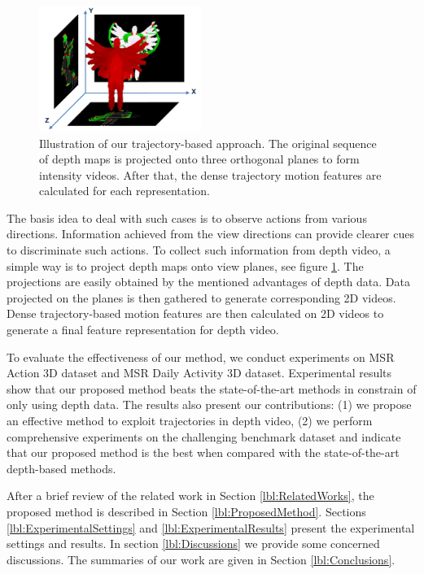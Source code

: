 \documentclass[final,3p,times,twocolumn]{elsarticle}
\begin{document}
\begin{figure}
	\begin{center}
		\includegraphics[width=0.47\textwidth]{Projections.pdf}
	\end{center}
	\caption{\label{lbl:Figure_ProposedMethod}Illustration of our trajectory-based approach. The original sequence of depth maps is projected onto three orthogonal planes to form intensity videos. After that, the dense trajectory motion features are calculated for each representation.}
\end{figure}

The basis idea to deal with such cases is to observe actions from various directions.
Information achieved from the view directions can provide clearer cues to discriminate such actions.
To collect such information from depth video, a simple way is to project depth maps onto view planes, see figure \ref{lbl:Figure_ProposedMethod}.
The projections are easily obtained by the mentioned advantages of depth data.
Data projected on the planes is then gathered to generate corresponding 2D videos.
Dense trajectory-based motion features are then calculated on 2D videos to generate a final feature representation for depth video.

To evaluate the effectiveness of our method, we conduct experiments on MSR Action 3D dataset and MSR Daily Activity 3D dataset.
Experimental results show that our proposed method beats the state-of-the-art methods in constrain of only using depth data.
The results also present our contributions: (1) we propose an effective method to exploit trajectories in depth video, (2) we perform comprehensive experiments on the challenging benchmark dataset and indicate that our proposed method is the best when compared with the state-of-the-art depth-based methods.

After a brief review of the related work in Section \ref{lbl:RelatedWorks}, the proposed method is described in Section \ref{lbl:ProposedMethod}. Sections \ref{lbl:ExperimentalSettings} and \ref{lbl:ExperimentalResults} present the experimental settings and results. In section \ref{lbl:Discussions} we provide some concerned discussions. The summaries of our work are given in Section \ref{lbl:Conclusions}.
\end{document}
